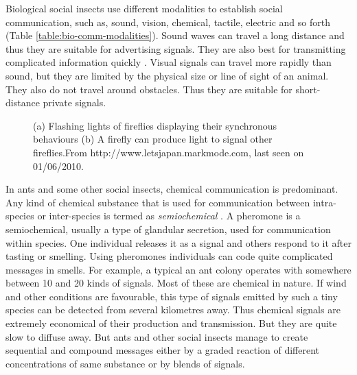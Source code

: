 Biological social insects use different modalities to establish social communication, such as, sound, vision, chemical, tactile,  electric and so forth (Table \ref{table:bio-comm-modalities}).  Sound waves can travel a long distance and thus they are suitable for advertising signals. They are also best for transmitting complicated information quickly \cite{Slater1986}. Visual signals can travel more rapidly than sound, but they are limited by the physical size or line of sight of an animal. They also do not travel around obstacles. Thus they are suitable for short-distance private signals.

\begin{figure}[htp]
\centering
{} 
\hspace{0.25cm}
\caption{(a) Flashing lights of fireflies displaying their synchronous behaviours (b) A firefly can produce light to signal other fireflies.\protect\newline From http://www.letsjapan.markmode.com, last seen on 01/06/2010.}
\label{fig:fireflies}
\end{figure}
%
In ants and some other social insects, chemical communication is predominant. Any kind of chemical substance that is used for communication between intra-species or inter-species is termed as {\em semiochemical} \cite{Holldobler1990}. A pheromone is a semiochemical, usually a type of glandular secretion, used for communication within species. One individual releases it as a signal and others respond to it after tasting or smelling. Using pheromones individuals can code quite complicated messages in smells. For example, a typical an ant colony operates with somewhere between 10 and 20 kinds of signals. Most of these are chemical in nature. If wind and other conditions are favourable,  this type of signals emitted by such a tiny species can be detected from several kilometres away. Thus chemical signals are extremely economical of their production and transmission. But they are quite slow to diffuse away. But ants and other social insects manage to create sequential and compound messages either by a graded reaction of different concentrations of same substance or by blends of signals.

